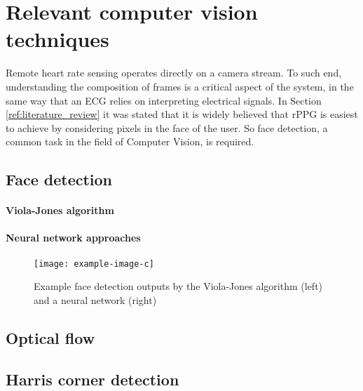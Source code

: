 \section{Relevant computer vision techniques}
Remote heart rate sensing operates directly on a camera stream. To such end, understanding the composition of frames is a critical 
aspect of the system, in the same way that an ECG relies on interpreting electrical signals. In Section \ref{ref:literature_review} it was stated that it is widely believed that 
rPPG is easiest to achieve by considering pixels in the face of the user. So face detection, a common task in the field of Computer Vision, is required.
\subsection{Face detection}
\paragraph{Viola-Jones algorithm}

\paragraph{Neural network approaches}

\begin{figure}[H]
    \texttt{[image: example-image-c]}
   \caption{Example face detection outputs by the Viola-Jones algorithm (left) and a neural network (right) } 
\end{figure}

\subsection{Optical flow}

\subsection{Harris corner detection}

